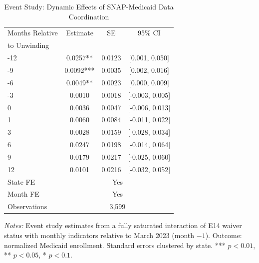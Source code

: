\begin{table}[t]
\centering
\caption{Event Study: Dynamic Effects of SNAP-Medicaid Data Coordination}
\label{tab:eventstudy}
\small
\begin{tabular}{lccc}
\toprule
Months Relative & Estimate & SE & 95\% CI \\
to Unwinding & & & \\
\midrule
-12 & 0.0257** & 0.0123 & [0.001, 0.050] \\
-9 & 0.0092*** & 0.0035 & [0.002, 0.016] \\
-6 & 0.0049** & 0.0023 & [0.000, 0.009] \\
-3 & 0.0010 & 0.0018 & [-0.003, 0.005] \\
0 & 0.0036 & 0.0047 & [-0.006, 0.013] \\
1 & 0.0060 & 0.0084 & [-0.011, 0.022] \\
3 & 0.0028 & 0.0159 & [-0.028, 0.034] \\
6 & 0.0247 & 0.0198 & [-0.014, 0.064] \\
9 & 0.0179 & 0.0217 & [-0.025, 0.060] \\
12 & 0.0101 & 0.0216 & [-0.032, 0.052] \\
\midrule
State FE & \multicolumn{3}{c}{Yes} \\
Month FE & \multicolumn{3}{c}{Yes} \\
Observations & \multicolumn{3}{c}{3,599} \\
\bottomrule
\end{tabular}
\begin{tablenotes}
\item \textit{Notes:} Event study estimates from a fully saturated interaction of E14 waiver status with monthly indicators relative to March 2023 (month $-1$). Outcome: normalized Medicaid enrollment. Standard errors clustered by state. *** $p<0.01$, ** $p<0.05$, * $p<0.1$.
\end{tablenotes}
\end{table}

